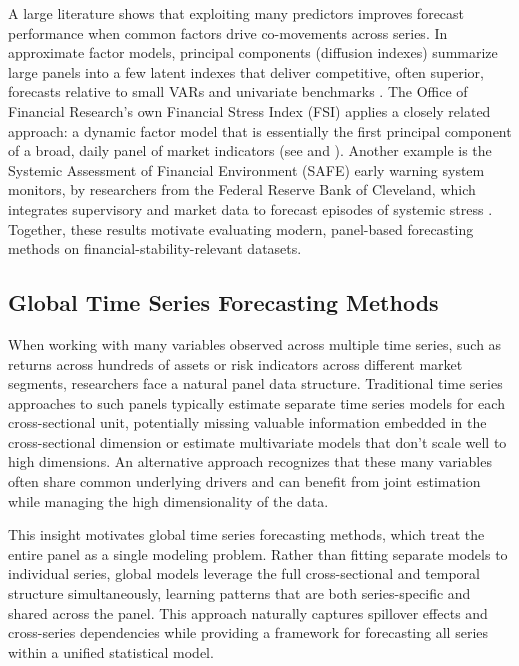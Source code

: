 \documentclass{article}
\begin{document}
A large literature shows that exploiting many predictors improves forecast performance when common factors drive co-movements across series. In approximate factor models, principal components (diffusion indexes) summarize large panels into a few latent indexes that deliver competitive, often superior, forecasts relative to small VARs and univariate benchmarks \citep{Stock2002,Stock2002a,Stock}. The Office of Financial Research's own Financial Stress Index (FSI) applies a closely related approach: a dynamic factor model that is essentially the first principal component of a broad, daily panel of market indicators (see \citet{Monin2019} and \citep{Bejarano2023}). Another example is the Systemic Assessment of Financial Environment (SAFE) early warning system monitors, by researchers from the Federal Reserve Bank of Cleveland, which integrates supervisory and market data to forecast episodes of systemic stress \citep{Oet2011}. Together, these results motivate evaluating modern, panel-based forecasting methods on financial-stability-relevant datasets.

\subsection{Global Time Series Forecasting Methods}

When working with many variables observed across multiple time series, such as returns across hundreds of assets or risk indicators across different market segments, researchers face a natural panel data structure. Traditional time series approaches to such panels typically estimate separate time series models for each cross-sectional unit, potentially missing valuable information embedded in the cross-sectional dimension or estimate multivariate models that don't scale well to high dimensions. An alternative approach recognizes that these many variables often share common underlying drivers and can benefit from joint estimation while managing the high dimensionality of the data.

This insight motivates global time series forecasting methods, which treat the entire panel as a single modeling problem. Rather than fitting separate models to individual series, global models leverage the full cross-sectional and temporal structure simultaneously, learning patterns that are both series-specific and shared across the panel. This approach naturally captures spillover effects and cross-series dependencies while providing a framework for forecasting all series within a unified statistical model.
\end{document}
